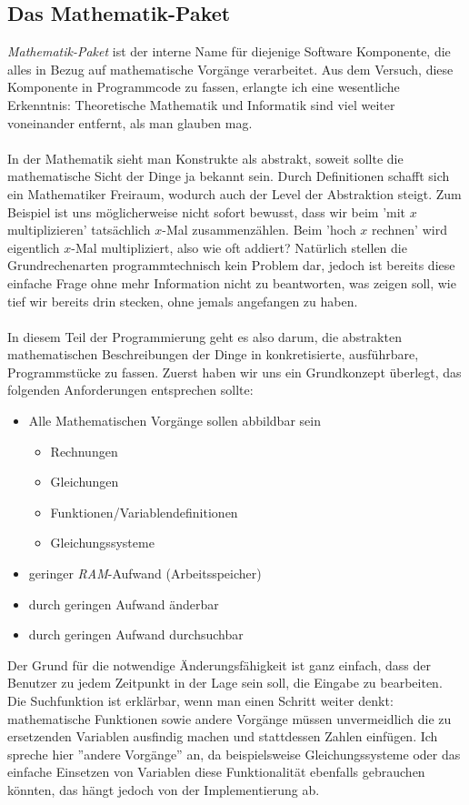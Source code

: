 \subsection{Das Mathematik-Paket}
\textit{Mathematik-Paket} ist der interne Name für diejenige Software Komponente, die alles in Bezug auf mathematische Vorgänge verarbeitet. Aus dem Versuch, diese Komponente in Programmcode zu fassen, erlangte ich eine wesentliche Erkenntnis: Theoretische Mathematik und Informatik sind viel weiter voneinander entfernt, als man glauben mag.\\\\
In der Mathematik sieht man Konstrukte als abstrakt, soweit sollte die mathematische Sicht der Dinge ja bekannt sein. Durch Definitionen schafft sich ein Mathematiker Freiraum, wodurch auch der Level der Abstraktion steigt. Zum Beispiel ist uns möglicherweise nicht sofort bewusst, dass wir beim 'mit $x$ multiplizieren' tatsächlich $x$-Mal zusammenzählen. Beim 'hoch $x$ rechnen' wird eigentlich $x$-Mal multipliziert, also wie oft addiert? Natürlich stellen die Grundrechenarten programmtechnisch kein Problem dar, jedoch ist bereits diese einfache Frage ohne mehr Information nicht zu beantworten, was zeigen soll, wie tief wir bereits drin stecken, ohne jemals angefangen zu haben.\\\\
In diesem Teil der Programmierung geht es also darum, die abstrakten mathematischen Beschreibungen der Dinge in konkretisierte, ausführbare, Programmstücke zu fassen. Zuerst haben wir uns ein Grundkonzept überlegt, das folgenden Anforderungen entsprechen sollte:
\begin{itemize}
	\item Alle Mathematischen Vorgänge sollen abbildbar sein
	\begin{itemize}
		\item Rechnungen
		\item Gleichungen
		\item Funktionen/Variablendefinitionen
		\item Gleichungssysteme
	\end{itemize}
	\item geringer \textit{RAM}-Aufwand (Arbeitsspeicher)
	\item durch geringen Aufwand änderbar
	\item durch geringen Aufwand durchsuchbar
\end{itemize}
Der Grund für die notwendige Änderungsfähigkeit ist ganz einfach, dass der Benutzer zu jedem Zeitpunkt in der Lage sein soll, die Eingabe zu bearbeiten. Die Suchfunktion ist erklärbar, wenn man einen Schritt weiter denkt: mathematische Funktionen sowie andere Vorgänge müssen unvermeidlich die zu ersetzenden Variablen ausfindig machen und stattdessen Zahlen einfügen. Ich spreche hier ''andere Vorgänge'' an, da beispielsweise Gleichungssysteme oder das einfache Einsetzen von Variablen diese Funktionalität ebenfalls gebrauchen könnten, das hängt jedoch von der Implementierung ab.\\
